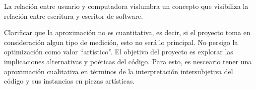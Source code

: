 La relación entre usuario y computadora vislumbra un concepto que visibiliza la relación entre escritura y escritor de software. %










Clarificar que la aproximación no es cuantitativa, es decir, si el proyecto toma en consideración algun tipo de medición, esto no será lo principal. No persigo la optimización como valor ``artístico''. El objetivo del proyecto es explorar las implicaciones alternativas y poéticas del código. Para esto, es nesceario tener una aproximación cualitativa en términos de la interpretación intersubjetiva del código y sus instancias en piezas artísticas. 


